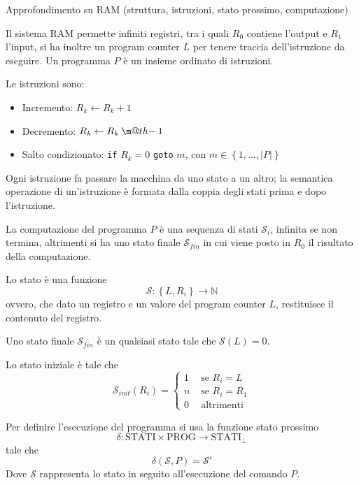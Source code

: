 \documentclass[12pt, answers]{exam}
\makeatletter
\theoremstyle{plain}
\newcommand{\prog}{\text{PROG}}
\newcommand{\ram}{\text{RAM}}
\newcommand{\stati}{\text{STATI}}
\newcommand{\st}{\mathcal{S}}
\newcommand{\N}{\mathbb{N}}
\newcommand{\dotminus}{\mathbin{\text{\@dotminus}}}
\newcommand{\@dotminus}{%
    \ooalign{\hidewidth\raise1ex\hbox{.}\hidewidth\cr$\m@th-$\cr}%
}
\makeatother
\begin{document}
\begin{questions}
        \question Approfondimento su RAM (struttura, istruzioni, stato prossimo, computazione)
        
        \begin{solution}
            Il sistema $\ram$ permette infiniti registri, tra i quali $R_0$ contiene l'output e $R_1$ l'input, si ha inoltre un program counter $L$ per tenere traccia dell'istruzione da eseguire. Un programma $P$ è un insieme ordinato di istruzioni. 
            
            Le istruzioni sono: 
            \begin{itemize}
                \item Incremento: $R_k \leftarrow R_k + 1$
                
                \item Decremento: $R_k \leftarrow R_k \dotminus 1$
                
                \item Salto condizionato: \texttt{if} $R_k = 0$ \texttt{goto} $m$, con $m \in \left\{1, \dots, |P|\right\}$
            \end{itemize}
            
            Ogni istruzione fa passare la macchina da uno stato a un altro; la semantica operazione di un'istruzione è formata dalla coppia degli stati prima e dopo l'istruzione.
            
            La computazione del programma $P$ è una sequenza di stati $\st_i$, infinita se non termina, altrimenti si ha uno stato finale $\st_{fin}$ in cui viene posto in $R_0$ il risultato della computazione.
            
            Lo stato è una funzione
            $$ \st: \left\{L, R_i\right\} \rightarrow \N $$
            ovvero, che dato un registro e un valore del program counter $L$, restituisce il contenuto del registro.
            
            Uno stato finale $\st_{fin}$ è un qualsiasi stato tale che $\st(L) = 0$.
            
            Lo stato iniziale è tale che
            $$ 
            \st_{init} (R_i) = \begin{cases}
                1 & \text{ se } R_i = L \\
                n & \text{ se } R_i = R_1 \\
                0 & \text{ altrimenti}
            \end{cases}
            $$
            
            Per definire l'esecuzione del programma si usa la funzione stato prossimo
            $$ \delta: \stati \times \prog \rightarrow \stati_\bot $$
            tale che 
            $$ \delta (\st, P) = \st'$$
            Dove $\st$ rappresenta lo stato in seguito all'esecuzione del comando $P$.
            

\end{solution}
\end{questions}
\end{document}
